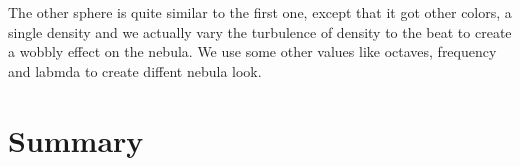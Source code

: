 \documentclass[a4paper, 12pt]{scrartcl}
\begin{document}
    The other sphere is quite similar to the first one, except that it got other colors, a single density and we actually vary the turbulence of density to the beat to create a wobbly effect on the nebula. 
    We use some other values like octaves, frequency and labmda to create diffent nebula look.

    \section{Summary}
\end{document}
